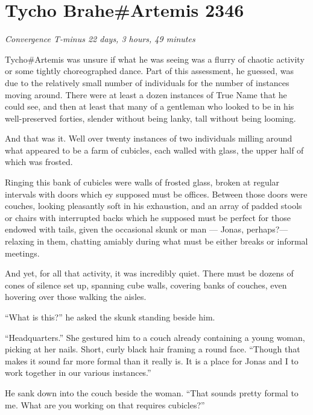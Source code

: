 \hypertarget{tycho-braheartemis-2346}{%
\chapter{Tycho Brahe\#Artemis 2346}}

\begin{center}
\emph{Convergence T-minus 22 days, 3 hours, 49 minutes}
\end{center}

\noindent Tycho\#Artemis was unsure if what he was seeing was a flurry of chaotic activity or some tightly choreographed dance. Part of this assessment, he guessed, was due to the relatively small number of individuals for the number of instances moving around. There were at least a dozen instances of True Name that he could see, and then at least that many of a gentleman who looked to be in his well-preserved forties, slender without being lanky, tall without being looming.

And that was it. Well over twenty instances of two individuals milling around what appeared to be a farm of cubicles, each walled with glass, the upper half of which was frosted.

Ringing this bank of cubicles were walls of frosted glass, broken at regular intervals with doors which ey supposed must be offices. Between those doors were couches, looking pleasantly soft in his exhaustion, and an array of padded stools or chairs with interrupted backs which he supposed must be perfect for those endowed with tails, given the occasional skunk or man — Jonas, perhaps?—relaxing in them, chatting amiably during what must be either breaks or informal meetings.

And yet, for all that activity, it was incredibly quiet. There must be dozens of cones of silence set up, spanning cube walls, covering banks of couches, even hovering over those walking the aisles.

``What is this?'' he asked the skunk standing beside him.

``Headquarters.'' She gestured him to a couch already containing a young woman, picking at her nails. Short, curly black hair framing a round face. ``Though that makes it sound far more formal than it really is. It is a place for Jonas and I to work together in our various instances.''

He sank down into the couch beside the woman. ``That sounds pretty formal to me. What are you working on that requires cubicles?''

